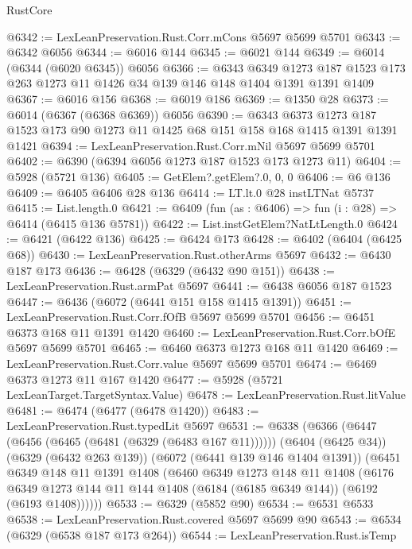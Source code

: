 \begin{lexlean}{RustCore}
\begin{coremodule}
{\begin{coremodule}
{{{{{{{{{{{{{{{{{{{{{{{{{{{{{{{{{{{{{{{{{{{{@6342 := LexLeanPreservation.Rust.Corr.mCons @5697 @5699 @5701
@6343 := @6342 @6056
@6344 := @6016 @144
@6345 := @6021 @144
@6349 := @6014 (@6344 (@6020 @6345)) @6056
@6366 := @6343
    @6349
    @1273
    @187
    @1523
    @173
    @263
    @1273
    @11
    @1426
    @34
    @139
    @146
    @148
    @1404
    @1391
    @1391
    @1409
@6367 := @6016 @156
@6368 := @6019 @186
@6369 := @1350 @28
@6373 := @6014 (@6367 (@6368 @6369)) @6056
@6390 := @6343
    @6373
    @1273
    @187
    @1523
    @173
    @90
    @1273
    @11
    @1425
    @68
    @151
    @158
    @168
    @1415
    @1391
    @1391
    @1421
@6394 := LexLeanPreservation.Rust.Corr.mNil @5697 @5699 @5701
@6402 := @6390 (@6394 @6056 @1273 @187 @1523 @173 @1273 @11)
@6404 := @5928 (@5721 @136)
@6405 := GetElem?.getElem?.{0, 0, 0}
@6406 := @6 @136
@6409 := @6405 @6406 @28 @136
@6414 := LT.lt.{0} @28 instLTNat @5737
@6415 := List.length.{0}
@6421 := @6409 (fun (as : @6406) => fun (i : @28) => @6414 (@6415 @136 @5781))
@6422 := List.instGetElem?NatLtLength.{0}
@6424 := @6421 (@6422 @136)
@6425 := @6424 @173
@6428 := @6402 (@6404 (@6425 @68))
@6430 := LexLeanPreservation.Rust.otherArms @5697
@6432 := @6430 @187 @173
@6436 := @6428 (@6329 (@6432 @90 @151))
@6438 := LexLeanPreservation.Rust.armPat @5697
@6441 := @6438 @6056 @187 @1523
@6447 := @6436 (@6072 (@6441 @151 @158 @1415 @1391))
@6451 := LexLeanPreservation.Rust.Corr.fOfB @5697 @5699 @5701
@6456 := @6451 @6373 @168 @11 @1391 @1420
@6460 := LexLeanPreservation.Rust.Corr.bOfE @5697 @5699 @5701
@6465 := @6460 @6373 @1273 @168 @11 @1420
@6469 := LexLeanPreservation.Rust.Corr.value @5697 @5699 @5701
@6474 := @6469 @6373 @1273 @11 @167 @1420
@6477 := @5928 (@5721 LexLeanTarget.TargetSyntax.Value)
@6478 := LexLeanPreservation.Rust.litValue
@6481 := @6474 (@6477 (@6478 @1420))
@6483 := LexLeanPreservation.Rust.typedLit @5697
@6531 := @6338
    (@6366
      (@6447 (@6456 (@6465 (@6481 (@6329 (@6483 @167 @11))))))
      (@6404 (@6425 @34))
      (@6329 (@6432 @263 @139))
      (@6072 (@6441 @139 @146 @1404 @1391))
      (@6451
        @6349
        @148
        @11
        @1391
        @1408
        (@6460
          @6349
          @1273
          @148
          @11
          @1408
          (@6176
            @6349
            @1273
            @144
            @11
            @144
            @1408
            (@6184 (@6185 @6349 @144))
            (@6192 (@6193 @1408))))))
@6533 := @6329 (@5852 @90)
@6534 := @6531 @6533
@6538 := LexLeanPreservation.Rust.covered @5697 @5699 @90
@6543 := @6534 (@6329 (@6538 @187 @173 @264))
@6544 := LexLeanPreservation.Rust.isTemp
}}}}}}}}}}}}}}}}}}}}}}}}}}}}}}}}}}}}}}}}}}}}
\end{coremodule}}
\end{coremodule}
\end{lexlean}
